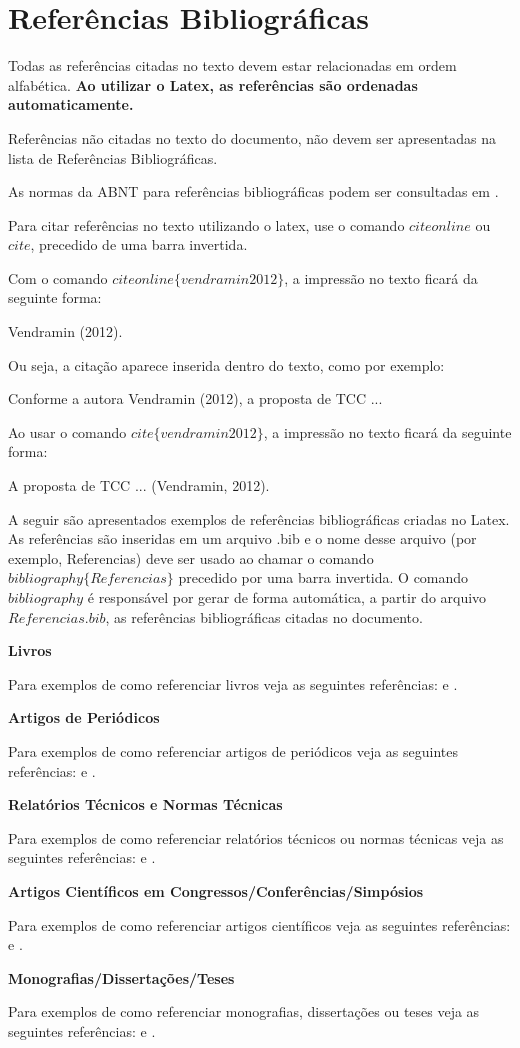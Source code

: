 
\chapter{Referências Bibliográficas}

Todas as referências citadas no texto devem estar relacionadas em ordem alfabética. \textbf{Ao utilizar o Latex, as referências são ordenadas automaticamente.}

Referências não citadas no texto do documento, não devem ser apresentadas na lista de Referências Bibliográficas.

As normas da ABNT para referências bibliográficas podem ser consultadas em \cite{NormasUTFPR}.

Para citar referências no texto utilizando o latex, use o comando $citeonline$ ou $cite$, precedido de uma barra invertida.

Com o comando $citeonline\{vendramin2012\}$, a impressão no texto ficará da seguinte forma:

Vendramin (2012).

Ou seja, a citação aparece inserida dentro do texto, como por exemplo:

Conforme a autora Vendramin (2012), a proposta de TCC ...

Ao usar o comando $cite\{vendramin2012\}$, a impressão no texto ficará da seguinte forma:

A proposta de TCC ... (Vendramin, 2012).

A seguir são apresentados exemplos de referências bibliográficas criadas no Latex. As referências são inseridas em um arquivo .bib e o nome desse arquivo (por exemplo, Referencias) deve ser usado ao chamar o comando $bibliography\{Referencias\}$ precedido por uma barra invertida. O comando $bibliography$ é responsável por gerar de forma automática, a partir do arquivo $Referencias.bib$, as referências bibliográficas citadas no documento.

\textbf{Livros}

Para exemplos de como referenciar livros veja as seguintes referências: \cite{castro2006} e \cite{ENGELBRECHT2007}.

\textbf{Artigos de Periódicos}

Para exemplos de como referenciar artigos de periódicos veja as seguintes referências: \cite{vendramin2012a} e \cite{cao2012}.

\textbf{Relatórios Técnicos e Normas Técnicas}

Para exemplos de como referenciar relatórios técnicos ou normas técnicas veja as seguintes referências: \cite{mills2004} e \cite{RFC5050}.

\textbf{Artigos Científicos em Congressos/Conferências/Simpósios}

Para exemplos de como referenciar artigos científicos veja as seguintes referências: \cite{vendramin2012b} e \cite{vendramin2011}.

\textbf{Monografias/Dissertações/Teses}

Para exemplos de como referenciar monografias, dissertações ou teses veja as seguintes referências: \cite{vendramin2012c} e \cite{saleem2001}.